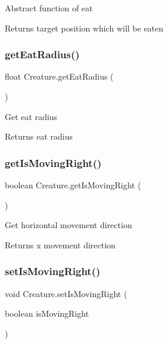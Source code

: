 Abstract function of eat \begin{DoxyReturn}{Returns}
target position which will be eaten 
\end{DoxyReturn}
\mbox{\label{class_creature_a081915b29b8deffca77eddbd4dc264ae}} 
\subsubsection{\texorpdfstring{get\+Eat\+Radius()}{getEatRadius()}}
{\footnotesize\ttfamily float Creature.\+get\+Eat\+Radius (\begin{DoxyParamCaption}{ }\end{DoxyParamCaption})\hspace{0.3cm}{\ttfamily [inline]}}

Get eat radius \begin{DoxyReturn}{Returns}
eat radius 
\end{DoxyReturn}
\mbox{\label{class_creature_aabe86755952b9468133db908895d2031}} 
\subsubsection{\texorpdfstring{get\+Is\+Moving\+Right()}{getIsMovingRight()}}
{\footnotesize\ttfamily boolean Creature.\+get\+Is\+Moving\+Right (\begin{DoxyParamCaption}{ }\end{DoxyParamCaption})\hspace{0.3cm}{\ttfamily [inline]}}

Get horizontal movement direction \begin{DoxyReturn}{Returns}
x movement direction 
\end{DoxyReturn}
\mbox{\label{class_creature_a36e69cbb4e68318fc9ef7ff08ff59ac1}} 
\subsubsection{\texorpdfstring{set\+Is\+Moving\+Right()}{setIsMovingRight()}}
{\footnotesize\ttfamily void Creature.\+set\+Is\+Moving\+Right (\begin{DoxyParamCaption}\item[{boolean}]{is\+Moving\+Right }\end{DoxyParamCaption})\hspace{0.3cm}{\ttfamily [inline]}}

